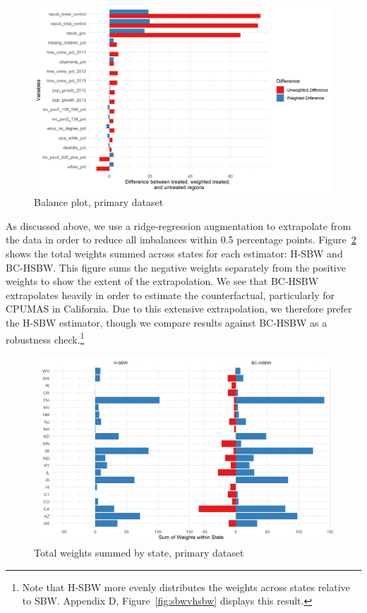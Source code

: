 \documentclass[aoas]{imsart}
\theoremstyle{plain}
\theoremstyle{remark}
\begin{document}
\begin{figure}[B]
\begin{center}
    \caption{Balance plot, primary dataset}
    \label{fig:loveplotc1}
    \includegraphics[scale=0.6]{01_Plots/balance-plot-etu.png}
\end{center}
\end{figure}

As discussed above, we use a ridge-regression augmentation to extrapolate from the data in order to reduce all imbalances within 0.5 percentage points. Figure~\ref{fig:statewghts} shows the total weights summed across states for each estimator: H-SBW and BC-HSBW. This figure sums the negative weights separately from the positive weights to show the extent of the extrapolation. We see that BC-HSBW extrapolates heavily in order to estimate the counterfactual, particularly for CPUMAS in California. Due to this extensive extrapolation, we therefore prefer the H-SBW estimator, though we compare results against BC-HSBW as a robustness check.\footnote{Note that H-SBW more evenly distributes the weights across states relative to SBW. Appendix D, Figure~\ref{fig:sbwvhsbw} displays this result.}

\begin{figure}[B]
\begin{center}
    \caption{Total weights summed by state, primary dataset}
    \label{fig:statewghts}
    \includegraphics[scale=0.6]{01_Plots/weights-by-state-hsbw-c1.png}
\end{center}
\end{figure}
\end{document}
